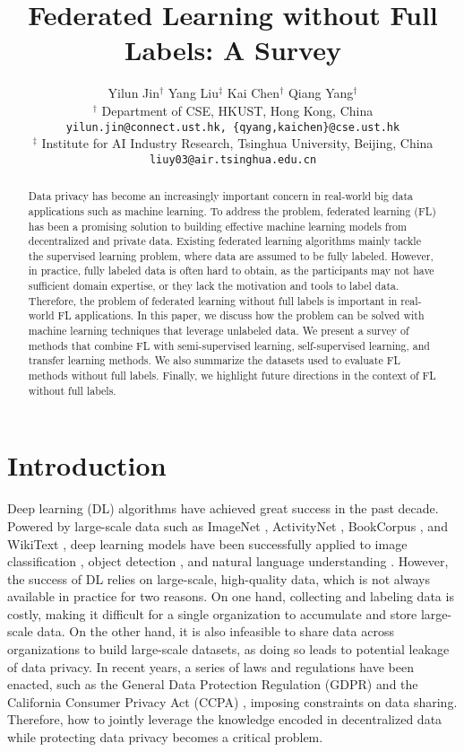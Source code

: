 \documentclass[11pt]{article}
\title{Federated Learning without Full Labels: A Survey}
\author{Yilun Jin$^{\dagger}$
\hspace{2em} Yang Liu$^{\ddagger}$
\hspace{2em} Kai Chen$^{\dagger}$
\hspace{2em} Qiang Yang$^\dagger$ \\
$^{\dagger}$ Department of CSE, HKUST, Hong Kong, China \\
\texttt{\small yilun.jin@connect.ust.hk, \{qyang,kaichen\}@cse.ust.hk}\\
$^{\ddagger}$ Institute for AI Industry Research, Tsinghua University, Beijing, China \\ \texttt{\small liuy03@air.tsinghua.edu.cn}}
\begin{document}
\maketitle
\begin{abstract}
Data privacy has become an increasingly important concern in real-world big data applications such as machine learning. To address the problem, federated learning (FL) has been a promising solution to building effective machine learning models from decentralized and private data. Existing federated learning algorithms mainly tackle the supervised learning problem, where data are assumed to be fully labeled. However, in practice, fully labeled data is often hard to obtain, as the participants may not have sufficient domain expertise, or they lack the motivation and tools to label data. Therefore, the problem of federated learning without full labels is important in real-world FL applications. In this paper, we discuss how the problem can be solved with machine learning techniques that leverage unlabeled data. We present a survey of methods that combine FL with semi-supervised learning, self-supervised learning, and transfer learning methods. We also summarize the datasets used to evaluate FL methods without full labels. Finally, we highlight future directions in the context of FL without full labels.
\end{abstract}

\section{Introduction}
Deep learning (DL) algorithms have achieved great success in the past decade. Powered by large-scale data such as ImageNet \cite{Yilun-deng2009imagenet}, ActivityNet \cite{Yilun-heilbron2015activitynet}, BookCorpus \cite{Yilun-zhu2015aligning}, and WikiText \cite{Yilun-merity2017pointer}, deep learning models have been successfully applied to image classification \cite{Yilun-he2016deep}, object detection \cite{Yilun-he2017mask}, and natural language understanding \cite{Yilun-devlin2019bert}. However, the success of DL relies on large-scale, high-quality data, which is not always available in practice for two reasons. On one hand, collecting and labeling data is costly, making it difficult for a single organization to accumulate and store large-scale data. On the other hand, it is also infeasible to share data across organizations to build large-scale datasets, as doing so leads to potential leakage of data privacy. In recent years, a series of laws and regulations have been enacted, such as the General Data Protection Regulation (GDPR) \cite{Yilun-gdpr} and the California Consumer Privacy Act (CCPA) \cite{Yilun-ccpa}, imposing constraints on data sharing. Therefore, how to jointly leverage the knowledge encoded in decentralized data while protecting data privacy becomes a critical problem.
\end{document}
